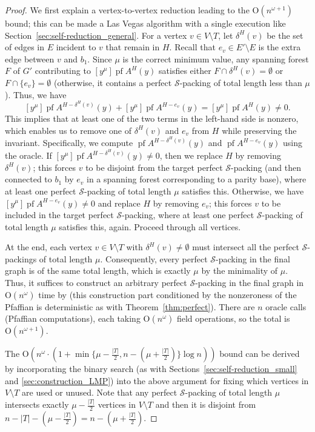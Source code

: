 \documentclass[11pt, a4paper]{article}
\theoremstyle{plain}
\theoremstyle{definition}
\theoremstyle{remark}
\newcommand{\cS}{\mathcal{S}}
\DeclareMathOperator{\pf}{pf}
\begin{document}
\begin{proof}
We first explain a vertex-to-vertex reduction leading to the $\mathrm{O}(n^{\omega + 1})$ bound; this can be made a Las Vegas algorithm with a single execution like Section~\ref{sec:self-reduction_general}.
For a vertex $v \in V \setminus T$, let $\delta^H(v)$ be the set of edges in $E$ incident to $v$ that remain in $H$.
Recall that $e_v \in E' \setminus E$ is the extra edge between $v$ and $b_1$.
Since $\mu$ is the correct minimum value, any spanning forest $F$ of $G'$ contributing to $[y^\mu]\pf A^{H}(y)$ satisfies either $F \cap \delta^H(v) = \emptyset$ or $F \cap \{e_v\} = \emptyset$ (otherwise, it contains a perfect $\cS$-packing of total length less than $\mu$).
Thus, we have 
\[[y^\mu]\pf A^{H - \delta^H(v)}(y) + [y^\mu]\pf A^{H - e_v}(y) = [y^\mu]\pf A^{H}(y) \neq 0.\]
This implies that at least one of the two terms in the left-hand side is nonzero, which enables us to remove one of $\delta^H(v)$ and $e_v$ from $H$ while preserving the invariant.
Specifically, we compute $\pf A^{H - \delta^H(v)}(y)$ and $\pf A^{H - e_v}(y)$ using the oracle.
If $[y^\mu]\pf A^{H - \delta^H(v)}(y) \neq 0$, then we replace $H$ by removing $\delta^H(v)$; this forces $v$ to be disjoint from the target perfect $\cS$-packing (and then connected to $b_1$ by $e_v$ in a spanning forest corresponding to a parity base), where at least one perfect $\cS$-packing of total length $\mu$ satisfies this.
Otherwise, we have $[y^\mu]\pf A^{H - e_v}(y) \neq 0$ and replace $H$ by removing $e_v$; this forces $v$ to be included in the target perfect $\cS$-packing, where at least one perfect $\cS$-packing of total length $\mu$ satisfies this, again.
Proceed through all vertices.

At the end, each vertex $v \in V \setminus T$ with $\delta^H(v) \neq \emptyset$ must intersect all the perfect $\cS$-packings of total length $\mu$.
Consequently, every perfect $\cS$-packing in the final graph is of the same total length, which is exactly $\mu$ by the minimality of $\mu$.
Thus, it suffices to construct an arbitrary perfect $\cS$-packing in the final graph in $\mathrm{O}(n^\omega)$ time by \cite[Section~5.1.3]{CLL2014} (this construction part conditioned by the nonzeroness of the Pfaffian is deterministic as with Theorem~\ref{thm:perfect}).
There are $n$ oracle calls (Pfaffian computations), each taking $\mathrm{O}(n^\omega)$ field operations, so the total is $\mathrm{O}(n^{\omega+1})$.

The $\mathrm{O}(n^\omega \cdot (1 + \min\{\mu - \frac{|T|}{2}, n - (\mu + \frac{|T|}{2})\} \log n))$ bound can be derived by incorporating the binary search (as with Sections~\ref{sec:self-reduction_small} and \ref{sec:construction_LMP}) into the above argument for fixing which vertices in $V \setminus T$ are used or unused.
Note that any perfect $\cS$-packing of total length $\mu$ intersects exactly $\mu - \frac{|T|}{2}$ vertices in $V \setminus T$ and then it is disjoint from $n - |T| - (\mu - \frac{|T|}{2}) = n - (\mu + \frac{|T|}{2})$.
\end{proof}
\end{document}
